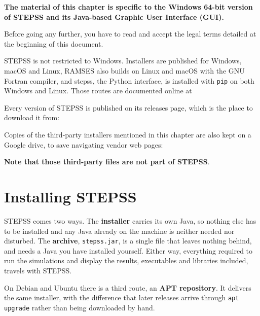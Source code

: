 {\bf \large The material of this chapter is specific to the Windows 64-bit version of STEPSS and its Java-based Graphic User Interface (GUI).

Before going any further, you have to read and accept the legal terms detailed at the beginning of this document.}

STEPSS is not restricted to Windows. Installers are published for Windows, macOS and Linux, RAMSES also builds on Linux and macOS with the GNU Fortran compiler, and stepss, the Python interface, is installed with {\tt pip} on both Windows and Linux. Those routes are documented online at\\
\hspace*{5ex}{\tt https://stepss.sps-lab.org}

Every version of STEPSS is published on its releases page, which is the place to download it from:\\
\hspace*{5ex}{\tt https://github.com/SPS-L/stepss-java-ui/releases}

Copies of the third-party installers mentioned in this chapter are also kept on a \hypertarget{Google}{Google drive}, to save navigating vendor web pages:\\
\hspace*{-7ex}{\tt https://drive.google.com/drive/folders/1HcUSD-FOx6192HURJnxltYJuKuNA8Vwz?usp=drive\_link}

{\bf \large Note that those third-party files are not part of STEPSS}.

\section{Installing STEPSS}

STEPSS comes two ways. The {\bf installer} carries its own Java, so nothing else has to be installed and any Java already on the machine is neither needed nor disturbed. The {\bf archive}, {\tt stepss.jar}, is a single file that leaves nothing behind, and needs a Java you have installed yourself. Either way, everything required to run the simulations and display the results, executables and libraries included, travels with STEPSS.

On Debian and Ubuntu there is a third route, an {\bf APT repository}. It delivers the same installer, with the difference that later releases arrive through {\tt apt upgrade} rather than being downloaded by hand.

